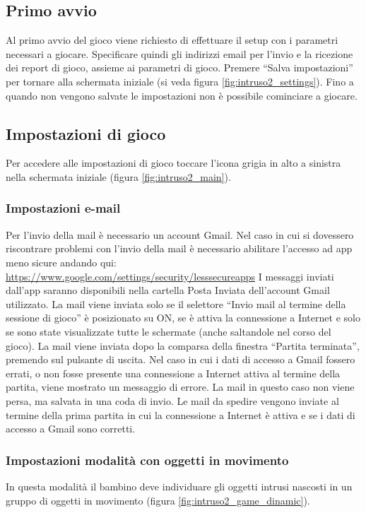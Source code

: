 \subsection{Primo avvio}
Al primo avvio del gioco viene richiesto di effettuare il setup con i parametri necessari a giocare. Specificare quindi gli indirizzi email per l'invio e la ricezione dei report di gioco, assieme ai parametri di gioco. Premere “Salva impostazioni” per tornare alla schermata iniziale (si veda figura \ref{fig:intruso2_settings}). Fino a quando non vengono salvate le impostazioni non è possibile cominciare a giocare.


\subsection{Impostazioni di gioco}
Per accedere alle impostazioni di gioco toccare l'icona grigia in alto a sinistra nella schermata iniziale (figura \ref{fig:intruso2_main}).


\subsubsection{Impostazioni e-mail}
Per l'invio della mail è necessario un account Gmail. Nel caso in cui si dovessero riscontrare problemi con l'invio della mail è necessario abilitare l'accesso ad app meno sicure andando qui: \url{https://www.google.com/settings/security/lesssecureapps}
I messaggi inviati dall'app saranno disponibili nella cartella Posta Inviata dell'account Gmail utilizzato.
La mail viene inviata solo se il selettore “Invio mail al termine della sessione di gioco” è posizionato su ON, se è attiva la connessione a Internet e solo se sono state visualizzate tutte le schermate (anche saltandole nel corso del gioco).
La mail viene inviata dopo la comparsa della finestra “Partita terminata”, premendo sul pulsante di uscita.
Nel caso in cui i dati di accesso a Gmail fossero errati, o non fosse presente una connessione a Internet attiva al termine della partita, viene mostrato un messaggio di errore. La mail in questo caso non viene persa, ma salvata in una coda di invio. Le mail da spedire vengono inviate al termine della prima partita in cui la connessione a Internet è attiva e se i dati di accesso a Gmail sono corretti.

\subsubsection{Impostazioni modalità con oggetti in movimento}
In questa modalità il bambino deve individuare gli oggetti intrusi nascosti in un gruppo di oggetti in movimento (figura \ref{fig:intruso2_game_dinamic}).

